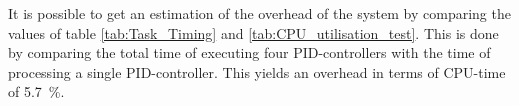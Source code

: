 \documentclass[../../main.tex]{subfiles}
\begin{document}
It is possible to get an estimation of the overhead of the system by comparing the values of table \ref{tab:Task_Timing} and \ref{tab:CPU_utilisation_test}. This is done by comparing the total time of executing four PID-controllers with the time of processing a single PID-controller.
This yields an overhead in terms of CPU-time of \SI{5.7}{\percent}.





\end{document}
